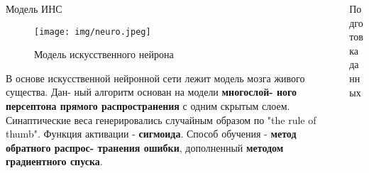 \documentclass[final]{beamer}
\newlength{\sepwid}
\newlength{\onecolwid}
\newlength{\twocolwid}
\begin{document}
\begin{frame}
\begin{columns}[t]
\begin{column}{\twocolwid} %

\begin{columns}[t,totalwidth=\twocolwid] %

\begin{column}{\onecolwid}\vspace{-.74in} %


\begin{exampleblock}{Модель ИНС}

\begin{figure}
\texttt{[image: img/neuro.jpeg]}
\caption{Модель искусственного нейрона}
\end{figure}

В основе искусственной нейронной сети лежит модель мозга живого существа. Дан- ный алгоритм основан на модели \textbf{многослой- ного персептона прямого распространения} с одним скрытым слоем. Синаптические веса генерировались случайным образом по "the rule of thumb". Функция активации - \textbf{сигмоида}. Способ обучения - \textbf{метод обратного распрос- транения ошибки}, дополненный \textbf{ методом градиентного спуска}.


\end{exampleblock}


\end{column} %
\begin{column}{\sepwid}\end{column} %

\begin{column}{\onecolwid}\vspace{-.74in} %


\begin{exampleblock}{Подготовка данных}


\end{exampleblock}
\end{column}
\end{columns}
\end{column}
\end{columns}
\end{frame}
\end{document}
